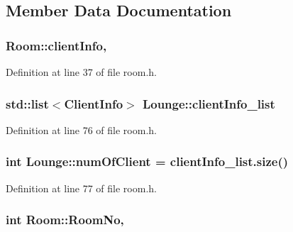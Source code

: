 \subsection{Member Data Documentation}
\subsubsection[{\texorpdfstring{client\+Info}{clientInfo}}]{ Room\+::client\+Info\hspace{0.3cm}{\ttfamily [protected]}, {\ttfamily [inherited]}}\hypertarget{class_room_a4dd1160fe55a497f7349488d934b1805}{}\label{class_room_a4dd1160fe55a497f7349488d934b1805}


Definition at line 37 of file room.\+h.

\subsubsection[{\texorpdfstring{client\+Info\+\_\+list}{clientInfo_list}}]{\setlength{\rightskip}{0pt plus 5cm}std\+::list$<${\bf Client\+Info}$>$ Lounge\+::client\+Info\+\_\+list\hspace{0.3cm}{\ttfamily [private]}}\hypertarget{class_lounge_aa78440709149245f5ed57d39008ba278}{}\label{class_lounge_aa78440709149245f5ed57d39008ba278}


Definition at line 76 of file room.\+h.

\subsubsection[{\texorpdfstring{num\+Of\+Client}{numOfClient}}]{\setlength{\rightskip}{0pt plus 5cm}int Lounge\+::num\+Of\+Client = client\+Info\+\_\+list.\+size()\hspace{0.3cm}{\ttfamily [private]}}\hypertarget{class_lounge_a3da2b80f26e521b988cbe7e1bfa0548b}{}\label{class_lounge_a3da2b80f26e521b988cbe7e1bfa0548b}


Definition at line 77 of file room.\+h.

\subsubsection[{\texorpdfstring{Room\+No}{RoomNo}}]{\setlength{\rightskip}{0pt plus 5cm}int Room\+::\+Room\+No\hspace{0.3cm}{\ttfamily [protected]}, {\ttfamily [inherited]}}\hypertarget{class_room_a7b2baed8e22a938246e54984cf396b47}{}\label{class_room_a7b2baed8e22a938246e54984cf396b47}


